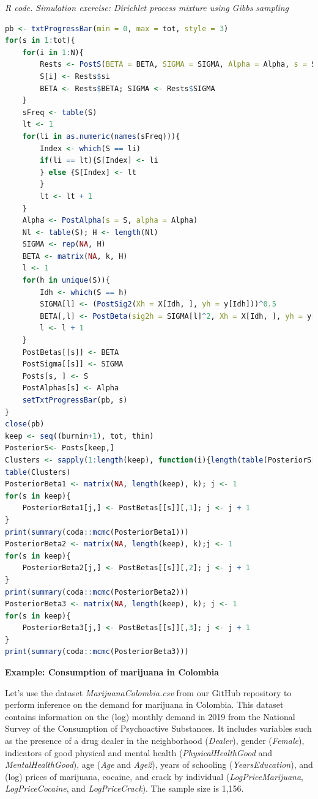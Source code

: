 \begin{tcolorbox}[enhanced,width=4.67in,center upper,
	fontupper=\large\bfseries,drop shadow southwest,sharp corners]
	\textit{R code. Simulation exercise: Dirichlet process mixture using Gibbs sampling}
	\begin{VF}
		\begin{lstlisting}[language=R]
pb <- txtProgressBar(min = 0, max = tot, style = 3)
for(s in 1:tot){
	for(i in 1:N){
		Rests <- PostS(BETA = BETA, SIGMA = SIGMA, Alpha = Alpha, s = S, i = i)
		S[i] <- Rests$si
		BETA <- Rests$BETA; SIGMA <- Rests$SIGMA
	}
  	sFreq <- table(S)
	lt <- 1
	for(li in as.numeric(names(sFreq))){
		Index <- which(S == li)
		if(li == lt){S[Index] <- li
		} else {S[Index] <- lt
		}
		lt <- lt + 1
	}
	Alpha <- PostAlpha(s = S, alpha = Alpha)
	Nl <- table(S); H <- length(Nl)
	SIGMA <- rep(NA, H)
	BETA <- matrix(NA, k, H)
	l <- 1
	for(h in unique(S)){
		Idh <- which(S == h)
		SIGMA[l] <- (PostSig2(Xh = X[Idh, ], yh = y[Idh]))^0.5
		BETA[,l] <- PostBeta(sig2h = SIGMA[l]^2, Xh = X[Idh, ], yh = y[Idh])
		l <- l + 1
	}
	PostBetas[[s]] <- BETA
	PostSigma[[s]] <- SIGMA
	Posts[s, ] <- S
	PostAlphas[s] <- Alpha
	setTxtProgressBar(pb, s)
}
close(pb)
keep <- seq((burnin+1), tot, thin)
PosteriorS<- Posts[keep,]
Clusters <- sapply(1:length(keep), function(i){length(table(PosteriorS[i,]))})
table(Clusters)
PosteriorBeta1 <- matrix(NA, length(keep), k); j <- 1
for(s in keep){
	PosteriorBeta1[j,] <- PostBetas[[s]][,1]; j <- j + 1
}
print(summary(coda::mcmc(PosteriorBeta1)))
PosteriorBeta2 <- matrix(NA, length(keep), k);j <- 1
for(s in keep){
	PosteriorBeta2[j,] <- PostBetas[[s]][,2]; j <- j + 1
}
print(summary(coda::mcmc(PosteriorBeta2)))
PosteriorBeta3 <- matrix(NA, length(keep), k); j <- 1
for(s in keep){
	PosteriorBeta3[j,] <- PostBetas[[s]][,3]; j <- j + 1
}
print(summary(coda::mcmc(PosteriorBeta3)))
\end{lstlisting}
	\end{VF}
\end{tcolorbox}

\textbf{Example: Consumption of marijuana in Colombia}

Let's use the dataset \textit{MarijuanaColombia.csv} from our GitHub repository to perform inference on the demand for marijuana in Colombia. This dataset contains information on the (log) monthly demand in 2019 from the National Survey of the Consumption of Psychoactive Substances. It includes variables such as the presence of a drug dealer in the neighborhood (\textit{Dealer}), gender (\textit{Female}), indicators of good physical and mental health (\textit{PhysicalHealthGood} and \textit{MentalHealthGood}), age (\textit{Age} and \textit{Age2}), years of schooling (\textit{YearsEducation}), and (log) prices of marijuana, cocaine, and crack by individual (\textit{LogPriceMarijuana}, \textit{LogPriceCocaine}, and \textit{LogPriceCrack}). The sample size is 1,156. 

